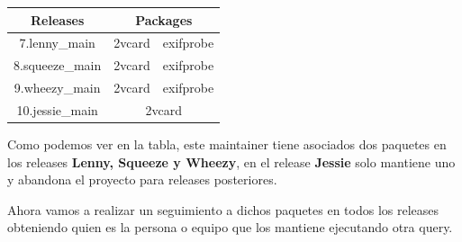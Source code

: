 \documentclass[a4paper, 12pt]{book}
\begin{document}
\begin{table}[h]
	\begin{tabular}{|c|cc|}
		\hline
		\rowcolor[HTML]{FFFE65} 
		Releases        & \multicolumn{2}{c|}{\cellcolor[HTML]{FFFE65}Packages} \\ \hline
		7.lenny\_main   & \multicolumn{1}{c|}{2vcard}        & exifprobe        \\ \hline
		8.squeeze\_main & \multicolumn{1}{c|}{2vcard}        & exifprobe        \\ \hline
		9.wheezy\_main  & \multicolumn{1}{c|}{2vcard}        & exifprobe        \\ \hline
		10.jessie\_main & \multicolumn{2}{c|}{2vcard}                           \\ \hline
	\end{tabular}
\end{table}

Como podemos ver en la tabla, este maintainer tiene asociados dos paquetes en los releases \textbf{Lenny, Squeeze y Wheezy}, en el release \textbf{Jessie} solo mantiene uno y abandona el proyecto para releases posteriores.

Ahora vamos a realizar un seguimiento a dichos paquetes en todos los releases obteniendo quien es la persona o equipo que los mantiene ejecutando otra query.
 
\end{document}
